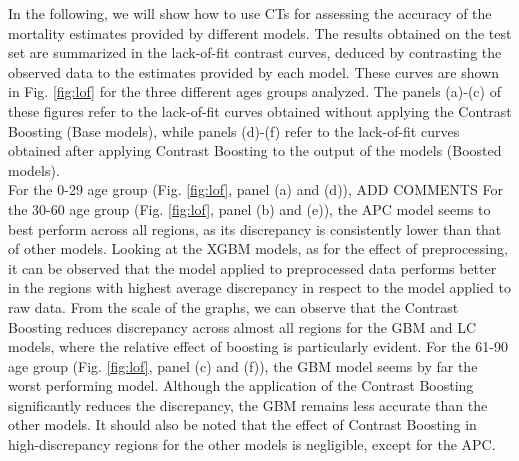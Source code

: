 \documentclass[fleqn,10pt]{wlscirep}
\begin{document}
In the following, we will show how to use CTs for assessing the accuracy of the mortality estimates provided by different models. 
The results obtained on the test set are summarized in the lack-of-fit contrast curves, deduced by contrasting the observed data to the estimates provided by each model.
\color{blue} These curves are shown in Fig. \ref{fig:lof} for the three different ages groups analyzed. The panels (a)-(c) of these figures refer to the lack-of-fit curves obtained without applying the Contrast Boosting (Base models), while panels (d)-(f) refer to the lack-of-fit curves obtained after applying Contrast Boosting to the output of the models (Boosted models).\\
For the 0-29 age group (Fig. \ref{fig:lof}, panel (a) and (d)), ADD COMMENTS \color{black}
For the 30-60 age group (Fig. \ref{fig:lof}, panel (b) and (e)), the APC model seems to best perform across all regions, as its discrepancy is consistently lower than that of other models. 
Looking at the XGBM models, as for the effect of preprocessing, it can be observed that the model applied to preprocessed data performs better in the regions with highest average discrepancy in respect to the model applied to raw data. 
From the scale of the graphs, we can observe that the Contrast Boosting reduces discrepancy across almost all regions for the GBM and LC models, where the relative effect of boosting is particularly evident. 
For the 61-90 age group (Fig. \ref{fig:lof}, panel (c) and (f)), the GBM model seems by far the worst performing model. Although the application of the Contrast Boosting significantly reduces the discrepancy, the GBM remains less accurate than the other models. It should also be noted that the effect of Contrast Boosting in high-discrepancy regions for the other models is negligible, except for the APC.
\end{document}
